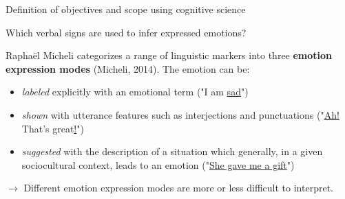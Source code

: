 \documentclass[handout,10pt]{beamer}
\begin{document}
\begin{frame}{Definition of objectives and scope using cognitive science}

Which verbal signs are used to infer expressed emotions?

\pause
\vspace{0.5cm}

Raphaël Micheli categorizes a range of linguistic markers into three \textbf{emotion expression modes} (Micheli, 2014). The emotion can be: 

\pause
\vspace{0.5cm}

\begin{itemize}[<+->]
    \item \textit{labeled} explicitly with an emotional term ("I am \underline{sad}")
    \item \textit{shown} with utterance features such as interjections and punctuations ("\underline{Ah!} That's great\underline{!}")
    \item \textit{suggested} with the description of a situation which generally, in a given sociocultural context, leads to an emotion ("\underline{She gave me a gift}")
\end{itemize}

\pause
\vspace{0.5cm}

$\rightarrow$ Different emotion expression modes are more or less difficult to interpret.
\end{frame}
\end{document}
